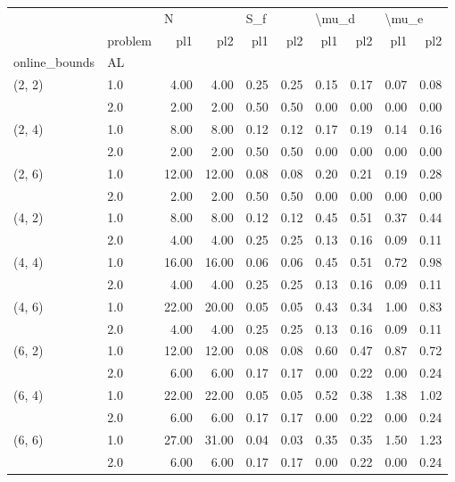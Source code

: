 \begin{tabular}{llrrrrrrrr}
\toprule
       & {} & \multicolumn{2}{l}{N} & \multicolumn{2}{l}{S\_f} & \multicolumn{2}{l}{\textbackslash mu\_d} & \multicolumn{2}{l}{\textbackslash mu\_e} \\
       & problem &   pl1 &   pl2 &  pl1 &  pl2 &   pl1 &  pl2 &   pl1 &  pl2 \\
online\_bounds & AL &       &       &      &      &       &      &       &      \\
\midrule
(2, 2) & 1.0 &  4.00 &  4.00 & 0.25 & 0.25 &  0.15 & 0.17 &  0.07 & 0.08 \\
       & 2.0 &  2.00 &  2.00 & 0.50 & 0.50 &  0.00 & 0.00 &  0.00 & 0.00 \\
(2, 4) & 1.0 &  8.00 &  8.00 & 0.12 & 0.12 &  0.17 & 0.19 &  0.14 & 0.16 \\
       & 2.0 &  2.00 &  2.00 & 0.50 & 0.50 &  0.00 & 0.00 &  0.00 & 0.00 \\
(2, 6) & 1.0 & 12.00 & 12.00 & 0.08 & 0.08 &  0.20 & 0.21 &  0.19 & 0.28 \\
       & 2.0 &  2.00 &  2.00 & 0.50 & 0.50 &  0.00 & 0.00 &  0.00 & 0.00 \\
(4, 2) & 1.0 &  8.00 &  8.00 & 0.12 & 0.12 &  0.45 & 0.51 &  0.37 & 0.44 \\
       & 2.0 &  4.00 &  4.00 & 0.25 & 0.25 &  0.13 & 0.16 &  0.09 & 0.11 \\
(4, 4) & 1.0 & 16.00 & 16.00 & 0.06 & 0.06 &  0.45 & 0.51 &  0.72 & 0.98 \\
       & 2.0 &  4.00 &  4.00 & 0.25 & 0.25 &  0.13 & 0.16 &  0.09 & 0.11 \\
(4, 6) & 1.0 & 22.00 & 20.00 & 0.05 & 0.05 &  0.43 & 0.34 &  1.00 & 0.83 \\
       & 2.0 &  4.00 &  4.00 & 0.25 & 0.25 &  0.13 & 0.16 &  0.09 & 0.11 \\
(6, 2) & 1.0 & 12.00 & 12.00 & 0.08 & 0.08 &  0.60 & 0.47 &  0.87 & 0.72 \\
       & 2.0 &  6.00 &  6.00 & 0.17 & 0.17 &  0.00 & 0.22 &  0.00 & 0.24 \\
(6, 4) & 1.0 & 22.00 & 22.00 & 0.05 & 0.05 &  0.52 & 0.38 &  1.38 & 1.02 \\
       & 2.0 &  6.00 &  6.00 & 0.17 & 0.17 &  0.00 & 0.22 &  0.00 & 0.24 \\
(6, 6) & 1.0 & 27.00 & 31.00 & 0.04 & 0.03 &  0.35 & 0.35 &  1.50 & 1.23 \\
       & 2.0 &  6.00 &  6.00 & 0.17 & 0.17 &  0.00 & 0.22 &  0.00 & 0.24 \\
\bottomrule
\end{tabular}
